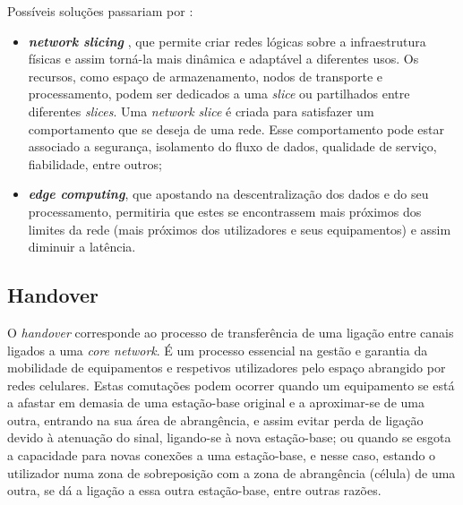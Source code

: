 \documentclass{llncs}
\begin{document}
Possíveis soluções passariam por :
\begin{itemize}
	\item \textit{\textbf{network slicing}} \cite{whitepaper}, que permite criar redes lógicas sobre a infraestrutura físicas e assim torná-la mais dinâmica e adaptável a diferentes usos. Os recursos, como espaço de armazenamento, nodos de transporte e processamento, podem ser dedicados a uma \textit{slice} ou partilhados entre diferentes \textit{slices}. Uma \textit{network slice} é criada para satisfazer um comportamento que se deseja de uma rede. Esse comportamento pode estar associado a segurança, isolamento do fluxo de dados, qualidade de serviço, fiabilidade, entre outros;
	\item \textit{\textbf{edge computing}}, que apostando na descentralização dos dados e do seu processamento, permitiria que estes se encontrassem mais próximos dos limites da rede (mais próximos dos utilizadores e seus equipamentos) e assim diminuir a latência.
\end{itemize}

\subsection{Handover}

O \textit{handover} corresponde ao processo de transferência de uma ligação entre canais ligados a uma \textit{core network}. É um processo essencial na gestão e garantia da mobilidade de equipamentos e respetivos utilizadores pelo espaço abrangido por redes celulares. Estas comutações podem ocorrer quando um equipamento se está a afastar em demasia de uma estação-base original e a aproximar-se de uma outra, entrando na sua área de abrangência, e assim evitar perda de ligação devido à atenuação do sinal, ligando-se à nova estação-base; ou quando se esgota a capacidade para novas conexões a uma estação-base, e nesse caso, estando o utilizador numa zona de sobreposição com a zona de abrangência (célula) de uma outra, se dá a ligação a essa outra estação-base, entre outras razões.
\end{document}
